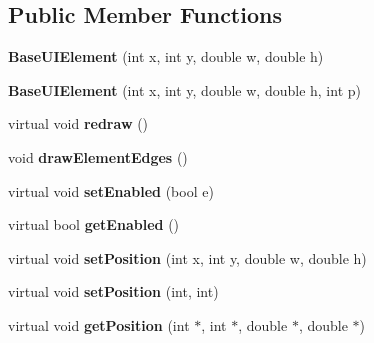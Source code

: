 \subsection*{Public Member Functions}
\begin{DoxyCompactItemize}
\item 
\hypertarget{classBaseUIElement_a504a9fc6aa113993c16e24d2a128b383}{{\bfseries Base\-U\-I\-Element} (int x, int y, double w, double h)}\label{classBaseUIElement_a504a9fc6aa113993c16e24d2a128b383}

\item 
\hypertarget{classBaseUIElement_a788f73bf664936f6140525e7870927b7}{{\bfseries Base\-U\-I\-Element} (int x, int y, double w, double h, int p)}\label{classBaseUIElement_a788f73bf664936f6140525e7870927b7}

\item 
\hypertarget{classBaseUIElement_a8e39a18f63d75f2c790b57e1639c984b}{virtual void {\bfseries redraw} ()}\label{classBaseUIElement_a8e39a18f63d75f2c790b57e1639c984b}

\item 
\hypertarget{classBaseUIElement_acb89742a813bbb3c564bdeeca82f5ec1}{void {\bfseries draw\-Element\-Edges} ()}\label{classBaseUIElement_acb89742a813bbb3c564bdeeca82f5ec1}

\item 
\hypertarget{classBaseUIElement_a474f083d9b09d0aa0ad81a861c440179}{virtual void {\bfseries set\-Enabled} (bool e)}\label{classBaseUIElement_a474f083d9b09d0aa0ad81a861c440179}

\item 
\hypertarget{classBaseUIElement_a560672179cd7a782c76f520e9b7ecc29}{virtual bool {\bfseries get\-Enabled} ()}\label{classBaseUIElement_a560672179cd7a782c76f520e9b7ecc29}

\item 
\hypertarget{classBaseUIElement_a6387aa84bf1c2893f850041684c34640}{virtual void {\bfseries set\-Position} (int x, int y, double w, double h)}\label{classBaseUIElement_a6387aa84bf1c2893f850041684c34640}

\item 
\hypertarget{classBaseUIElement_a83102b6dd32ab18487d0c222e4c49b37}{virtual void {\bfseries set\-Position} (int, int)}\label{classBaseUIElement_a83102b6dd32ab18487d0c222e4c49b37}

\item 
\hypertarget{classBaseUIElement_ac26f4c69ee4d1a2b1a822efd5a10ee93}{virtual void {\bfseries get\-Position} (int $\ast$, int $\ast$, double $\ast$, double $\ast$)}\label{classBaseUIElement_ac26f4c69ee4d1a2b1a822efd5a10ee93}


\end{DoxyCompactItemize}
